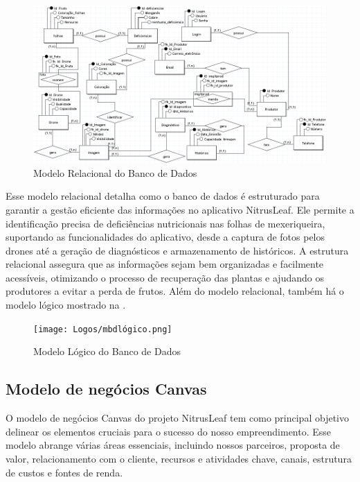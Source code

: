 \documentclass[
  a4paper,%
  12pt,%
  english,%
  brazilian,%
]{article}
\begin{document}
\begin{figure}[H]
    \centering
    \caption{Modelo Relacional do Banco de Dados}%
    \label{fig:mbdrelacional}
    \includegraphics[width=0.8\linewidth]{Logos/mbdrelacional.png}
    \end{figure}

Esse modelo relacional detalha como o banco de dados é estruturado para garantir a gestão eficiente das informações no aplicativo NitrusLeaf. Ele permite a identificação precisa de deficiências nutricionais nas folhas de mexeriqueira, suportando as funcionalidades do aplicativo, desde a captura de fotos pelos drones até a geração de diagnósticos e armazenamento de históricos. A estrutura relacional assegura que as informações sejam bem organizadas e facilmente acessíveis, otimizando o processo de recuperação das plantas e ajudando os produtores a evitar a perda de frutos. Além do modelo relacional, também há o modelo lógico mostrado na .

\begin{figure}[H]
\centering
\caption{Modelo Lógico do Banco de Dados}%
\label{fig:mbdlogico}
\texttt{[image: Logos/mbdlógico.png]}
\end{figure}

\subsection*{\textbf{Modelo de negócios Canvas}}

O modelo de negócios Canvas do projeto NitrusLeaf  tem como principal objetivo delinear os elementos cruciais para o sucesso do nosso empreendimento. Esse modelo abrange várias áreas essenciais, incluindo nossos parceiros, proposta de valor, relacionamento com o cliente, recursos e atividades chave, canais, estrutura de custos e fontes de renda.
\end{document}
